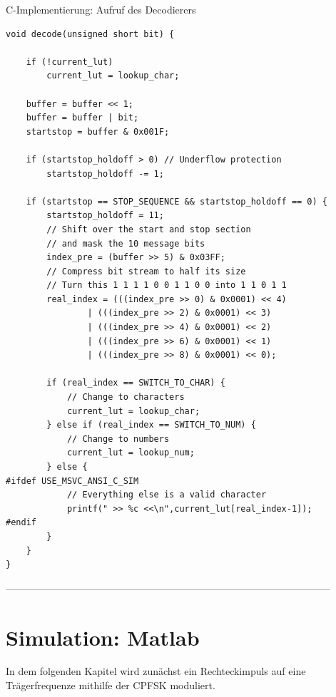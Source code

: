 \documentclass{article}
\begin{document}
\begin{listing}\label{codeC:decode}
    \caption{C-Implementierung: Aufruf des Decodierers}
    \begin{verbatim}
void decode(unsigned short bit) {

    if (!current_lut) 
        current_lut = lookup_char;

    buffer = buffer << 1;
    buffer = buffer | bit;
    startstop = buffer & 0x001F;

    if (startstop_holdoff > 0) // Underflow protection
        startstop_holdoff -= 1;

    if (startstop == STOP_SEQUENCE && startstop_holdoff == 0) {
        startstop_holdoff = 11;
        // Shift over the start and stop section
        // and mask the 10 message bits
        index_pre = (buffer >> 5) & 0x03FF; 
        // Compress bit stream to half its size
        // Turn this 1 1 1 1 0 0 1 1 0 0 into 1 1 0 1 1
        real_index = (((index_pre >> 0) & 0x0001) << 4) 
                | (((index_pre >> 2) & 0x0001) << 3) 
                | (((index_pre >> 4) & 0x0001) << 2) 
                | (((index_pre >> 6) & 0x0001) << 1) 
                | (((index_pre >> 8) & 0x0001) << 0);

        if (real_index == SWITCH_TO_CHAR) {
            // Change to characters
            current_lut = lookup_char;
        } else if (real_index == SWITCH_TO_NUM) {
            // Change to numbers
            current_lut = lookup_num;
        } else {
#ifdef USE_MSVC_ANSI_C_SIM
            // Everything else is a valid character
            printf(" >> %c <<\n",current_lut[real_index-1]); 
#endif
        }
    }
}
    \end{verbatim}
\end{listing}





--------------------------------------------------------------------------------------------------

\section{Simulation: Matlab}
In dem folgenden Kapitel wird zunächst ein Rechteckimpuls auf eine Trägerfrequenze mithilfe der \ac{CPFSK} moduliert.
\end{document}
